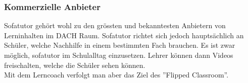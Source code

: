 \subsubsection{Kommerzielle Anbieter}
Sofatutor gehört wohl zu den grössten und bekanntesten Anbietern von Lerninhalten im DACH Raum. Sofatutor richtet sich jedoch hauptsächlich an Schüler, welche Nachhilfe in einem bestimmten Fach brauchen. Es ist zwar möglich, sofatutor im Schulalltag einzusetzen. Lehrer können dann Videos freischalten, welche die Schüler sehen können. \\

Mit dem Lerncoach verfolgt man aber das Ziel des ''Flipped Classroom''. 

\newpage